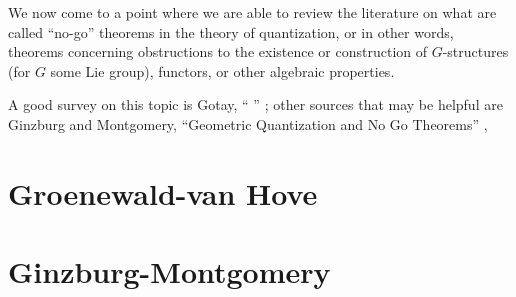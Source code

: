 We now come to a point where we are able to review the literature on what are called ``no-go'' theorems in the theory of quantization, or in other words, theorems concerning obstructions to the existence or construction of $G$-structures (for $G$ some Lie group), functors, or other algebraic properties.

A good survey on this topic is Gotay, `` '' \cite{gotay}; other sources that may be helpful are Ginzburg and Montgomery, ``Geometric Quantization and No Go Theorems'' \cite{ginzburgmontgomery},%

\section{Groenewald-van Hove}

\section{Ginzburg-Montgomery}

